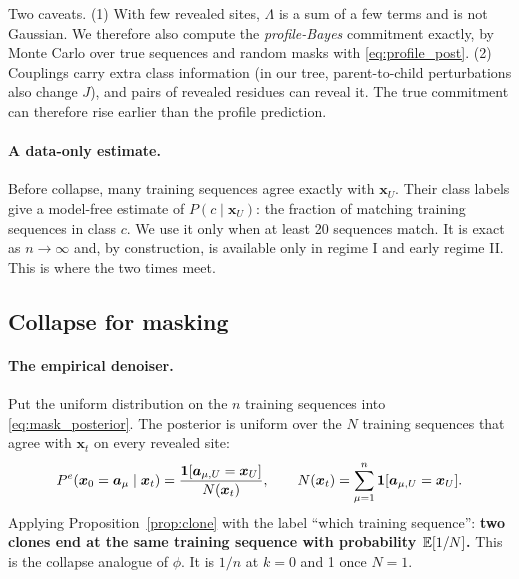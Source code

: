 Two caveats. (1) With few revealed sites, $\Lambda$ is a sum of a few terms and is not Gaussian. We therefore also
compute the \emph{profile-Bayes} commitment exactly, by Monte Carlo over true sequences and random masks with
\eqref{eq:profile_post}. (2) Couplings carry extra class information (in our tree, parent-to-child perturbations
also change $J$), and pairs of revealed residues can reveal it. The true commitment can therefore rise earlier than
the profile prediction.

\paragraph{A data-only estimate.} Before collapse, many training sequences agree exactly with $\bm x_U$. Their class
labels give a model-free estimate of $P(c\mid\bm x_U)$: the fraction of matching training sequences in class $c$. We
use it only when at least 20 sequences match. It is exact as $n\to\infty$ and, by construction, is available only
in regime I and early regime II. This is where the two times meet.

\subsection{Collapse for masking}\label{sec:dr_mask_coll}
\paragraph{The empirical denoiser.} Put the uniform distribution on the $n$ training sequences into
\eqref{eq:mask_posterior}. The posterior is uniform over the $N$ training sequences that agree with $\bm x_t$ on every
revealed site:
\begin{equation}\label{eq:emp_post}
P^e(\bm x_0=\bm a_\mu\mid\bm x_t)=\frac{\mathbf{1}[\bm a_{\mu,U}=\bm x_U]}{N(\bm x_t)},\qquad
N(\bm x_t)=\sum_{\mu=1}^n\mathbf{1}[\bm a_{\mu,U}=\bm x_U].
\end{equation}
Applying Proposition~\ref{prop:clone} with the label ``which training sequence'': \textbf{two clones end at the same
training sequence with probability $\mathbb{E}[1/N]$.} This is the collapse analogue of $\phi$. It is $1/n$ at $k=0$ and 1
once $N=1$.

